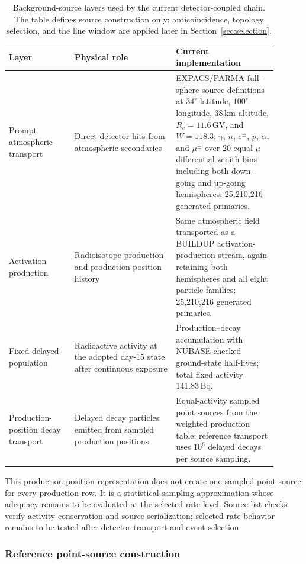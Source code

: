 \documentclass[11pt]{article}
\begin{document}
\begin{table}[t]
\centering
\caption{Background-source layers used by the current detector-coupled chain. The table defines source construction only; anticoincidence, topology selection, and the line window are applied later in Section~\ref{sec:selection}.}
\label{tab:background_source_model}
\begin{tabular}{p{0.22\linewidth}p{0.34\linewidth}p{0.34\linewidth}}
\hline
Layer & Physical role & Current implementation \\
\hline
Prompt atmospheric transport & Direct detector hits from atmospheric secondaries & EXPACS/PARMA full-sphere source definitions at $34^\circ$ latitude, $100^\circ$ longitude, $38\,\mathrm{km}$ altitude, $R_c=11.6\,\mathrm{GV}$, and $W=118.3$; $\gamma$, $n$, $e^\pm$, $p$, $\alpha$, and $\mu^\pm$ over 20 equal-$\mu$ differential zenith bins including both down-going and up-going hemispheres; 25,210,216 generated primaries. \\
Activation production & Radioisotope production and production-position history & Same atmospheric field transported as a BUILDUP activation-production stream, again retaining both hemispheres and all eight particle families; 25,210,216 generated primaries. \\
Fixed delayed population & Radioactive activity at the adopted day-15 state after continuous exposure & Production--decay accumulation with NUBASE-checked ground-state half-lives; total fixed activity $141.83\,\mathrm{Bq}$. \\
Production-position decay transport & Delayed decay particles emitted from sampled production positions & Equal-activity sampled point sources from the weighted production table; reference transport uses $10^6$ delayed decays per source sampling. \\
\hline
\end{tabular}
\end{table}

This production-position representation does not create one sampled point source
for every production row. It is a statistical sampling approximation whose
adequacy remains to be evaluated at the selected-rate level. Source-list checks
verify activity conservation and source serialization; selected-rate behavior
remains to be tested after detector transport and event selection.

\subsubsection{Reference point-source construction}
\label{subsec:pointsource}
\end{document}
